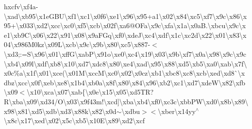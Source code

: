 h{}xcfv\textbackslash{}xf4a-\/\textbackslash{}xad\textbackslash{}xb95\textbackslash{}x1e\+G\+B\+U\textbackslash{}xf1\textbackslash{}xc1\textbackslash{}x0f6\textbackslash{}xe1\textbackslash{}x96\textbackslash{}x95+a1\textbackslash{}x02\textbackslash{}x84\textbackslash{}xc5\textbackslash{}xf7\textbackslash{}x9c\textbackslash{}x86\textbackslash{}x95+\textbackslash{}x033\textbackslash{}xd2\textbackslash{}xcc\textbackslash{}xc0\textbackslash{}xf5\textquotesingle{}\textbackslash{}xcb\textbackslash{}x02f\textbackslash{}xa6@\+O\+Fa\textbackslash{}x9c\textbackslash{}xfa\textbackslash{}x1a\textbackslash{}x0a\+B.\textbackslash{}xbcu\textbackslash{}x9c\textbackslash{}xe1\textbackslash{}xb9\+C\textbackslash{}x06\textbackslash{}x22\textbackslash{}x91\textbackslash{}x08\textbackslash{}x9a\+F\+Gq\textbackslash{}xf0\textbackslash{}xde\+J\textbackslash{}xc4\textbackslash{}xdf\textbackslash{}x1c\textbackslash{}xc2d\textbackslash{}x22\textbackslash{}x01\textbackslash{}x83\textbackslash{}x04\textbackslash{}x986\+M0kz\textbackslash{}x09\+L\textbackslash{}xcb\textbackslash{}x9c\textbackslash{}x9b\textbackslash{}x80\textbackslash{}xc5\textbackslash{}x887-\/$<$\textbackslash{}xd3;\+:=\+S\textbackslash{}x96\textbackslash{}x01\textbackslash{}xff\+G\textbackslash{}xab\+P\textbackslash{}x91o\textbackslash{}xe0\textbackslash{}xc4\textbackslash{}x19\textbackslash{}x03\textbackslash{}x9b\textbackslash{}xf7\textbackslash{}x0a\textbackslash{}x98\textbackslash{}x9c\textbackslash{}x9c\textbackslash{}xb4\textbackslash{}x09l\textbackslash{}xdf\textbackslash{}xb8\textbackslash{}x10\textbackslash{}xd7\textbackslash{}xdc8\textbackslash{}x80\textbackslash{}xe4\textbackslash{}xad\textbackslash{}x95\textbackslash{}x88\textbackslash{}xd5\textbackslash{}xb5\textbackslash{}xa0\textbackslash{}xab\textbackslash{}x7f\textbackslash{}x0c\%a\textbackslash{}x1f\textbackslash{}x01\textbackslash{}xce(\textbackslash{}x01\+M\textbackslash{}xcc\+M\textbackslash{}xc0\textbackslash{}x02\textbackslash{}x0cz\textbackslash{}xb1\textbackslash{}xbc8\textbackslash{}xc8\textbackslash{}xcb\textbackslash{}xed\textbackslash{}xd8\`{}\textbackslash{}xdbz\textbackslash{}xcc\textbackslash{}x0f\textbackslash{}xeb\textbackslash{}xe8\textbackslash{}x1b4\textbackslash{}xb0a\textbackslash{}x8f\textbackslash{}x80\textbackslash{}x84\textbackslash{}x96\textbackslash{}xb2\textbackslash{}xc1\textbackslash{}xd7\textbackslash{}xde\+W\textbackslash{}x82\textbackslash{}xfb\textbackslash{}x09$<$\textbackslash{}x10\textbackslash{}xca\textbackslash{}x07\textbackslash{}xab\{\textbackslash{}x0e\textbackslash{}x15\textbackslash{}x05\textbackslash{}xd5\+T\+R?\+R\textbackslash{}xba\textbackslash{}x09\textbackslash{}xd34/\+O\textbackslash{}x03\textbackslash{}x9f43m!\textbackslash{}xcd\mbox{]}\textbackslash{}xba\textbackslash{}xb4\textbackslash{}xf0\textbackslash{}xc3c\textbackslash{}xbb\+P\+W\textbackslash{}xd0\textbackslash{}x8b\textbackslash{}x89\textbackslash{}x98\textbackslash{}x81\textbackslash{}xd5\textbackslash{}xdb\textbackslash{}xd3\textbackslash{}x88k\textbackslash{}x82\textbackslash{}x0d$\sim$\textbackslash{}xdbu$>$$<$\textbackslash{}xber\textbackslash{}x14yy$^\wedge$\textbackslash{}x8c\textbackslash{}x17\textbackslash{}xed\textbackslash{}x02\textbackslash{}x5c\textbackslash{}xb5\textbackslash{}x10\+E\textbackslash{}x89\textbackslash{}xd2\textbackslash{}xcf\tex
